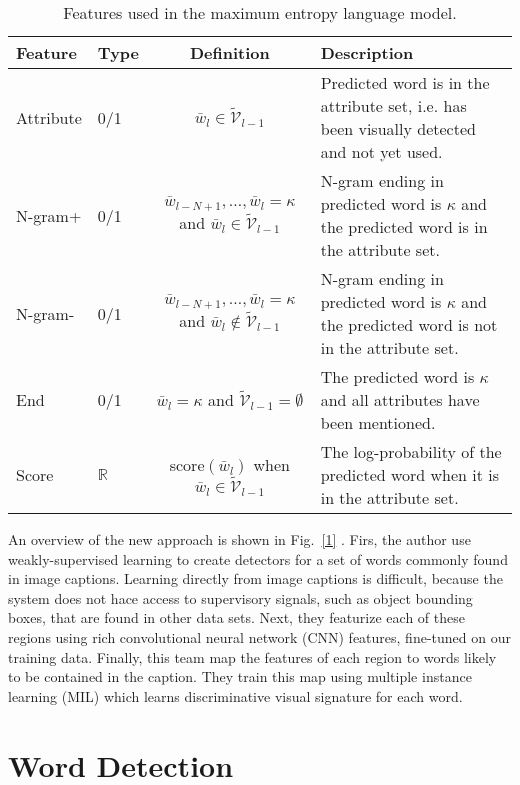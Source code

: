 \documentclass[10pt,twocolumn,letterpaper]{article}
\begin{document}
\begin{table*}
\small
\renewcommand\arraystretch{1.2}
\centering
\begin{tabular}{|l|l|c|l|}
\hline
Feature & Type & Definition & Description  \\
\hline
Attribute & 0/1 & $\bar{w}_l\in\mathcal{\widetilde{V}}_{l-1}$ & Predicted word is in the attribute set, i.e. has been visually detected and not yet used. \\

N-gram+ & 0/1 & $\bar{w}_{l-N+1},\dots,\bar{w}_l=\kappa$ and $\bar{w}_l\in\mathcal{\widetilde{V}}_{l-1}$ & N-gram ending in predicted word is $\kappa$ and the predicted word is in the attribute set. \\

N-gram- & 0/1 & $\bar{w}_{l-N+1},\dots,\bar{w}_l=\kappa$ and $\bar{w}_l\notin\mathcal{\widetilde{V}}_{l-1}$ & N-gram ending in predicted word is $\kappa$ and the predicted word is not in the attribute set. \\

End & 0/1 & $\bar{w}_l=\kappa$ and $\mathcal{\widetilde{V}}_{l-1}=\emptyset$ & The predicted word is $\kappa$ and all attributes have been mentioned. \\

Score & $\mathbb{R}$ & score$(\bar{w}_l)$ when $\bar{w}_l\in\mathcal{\widetilde{V}}_{l-1}$ & The log-probability of the predicted word when it is in the attribute set. \\
\hline
\end{tabular} 
\caption{Features used in the maximum entropy language model.}
\label{tab1}
\end{table*}
\par 
An overview of the new approach is shown in Fig.~\ref{1} \cite{Fang2015From}. Firs, the author use weakly-supervised learning to create detectors for a set of words commonly found in image captions. Learning directly from image captions is difficult, because the system does not hace access to supervisory signals, such as object bounding boxes, that are found in other data sets. Next, they featurize each of these regions using rich convolutional neural network (CNN) features, fine-tuned on our training data. Finally, this team map the features of each region to words likely to be contained in the caption. They train this map using multiple instance learning (MIL)\cite{Maron1998A} which learns discriminative visual signature for each word.

\section{Word Detection}
\end{document}
